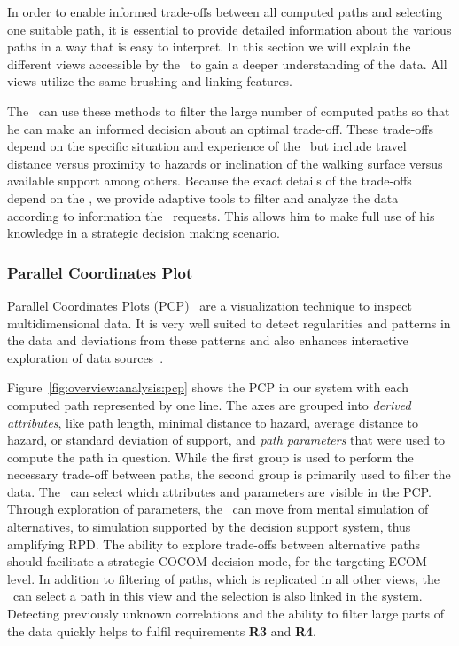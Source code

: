 In order to enable informed trade-offs between all computed paths and selecting one suitable path, it is essential to provide detailed information about the various paths in a way that is easy to interpret. In this section we will explain the different views accessible by the \IC\ to gain a deeper understanding of the data. All views utilize the same brushing and linking features.

The \IC\ can use these methods to filter the large number of computed paths so that he can make an informed decision about an optimal trade-off. These trade-offs depend on the specific situation and experience of the \IC\ but include travel distance versus proximity to hazards or inclination of the walking surface versus available support among others. Because the exact details of the trade-offs depend on the \IC, we provide adaptive tools to filter and analyze the data according to information the \IC\ requests. This allows him to make full use of his knowledge in a strategic decision making scenario.

\subsubsection{Parallel Coordinates Plot} \label{sec:overview:analysis:pcp}
Parallel Coordinates Plots (PCP)~\cite{146402} are a visualization technique to inspect multidimensional data. It is very well suited to detect regularities and patterns in the data and deviations from these patterns and also enhances interactive exploration of data sources~\cite{Tory05aparallel}.

Figure~\ref{fig:overview:analysis:pcp} shows the PCP in our system with each computed path represented by one line. The axes are grouped into \emph{derived attributes}, like path length, minimal distance to hazard, average distance to hazard, or standard deviation of support, and \emph{path parameters} that were used to compute the path in question. While the first group is used to perform the necessary trade-off between paths, the second group is primarily used to filter the data. The \IC\ can select which attributes and parameters are visible in the PCP.  Through exploration of parameters, the \IC\ can move from mental simulation of alternatives, to simulation supported by the decision support system, thus amplifying RPD. The ability to explore trade-offs between alternative paths should facilitate a strategic COCOM decision mode, for the targeting ECOM level. In addition to filtering of paths, which is replicated in all other views, the \IC\ can select a path in this view and the selection is also linked in the system. Detecting previously unknown correlations and the ability to filter large parts of the data quickly helps to fulfil requirements {\bfseries R3} and {\bfseries R4}.

